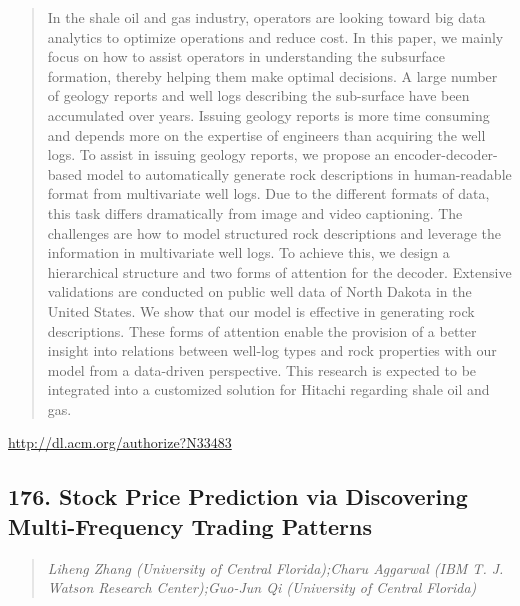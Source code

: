 \documentclass{article}
\begin{document}
\begin{quote}
In the shale oil and gas industry, operators are looking toward big data analytics to optimize operations and reduce cost. In this paper, we mainly focus on how to assist operators in understanding the subsurface formation, thereby helping them make optimal decisions. A large number of geology reports and well logs describing the sub-surface have been accumulated over years. Issuing geology reports is more time consuming and depends more on the expertise of engineers than acquiring the well logs. To assist in issuing geology reports, we propose an encoder-decoder-based model to automatically generate rock descriptions in human-readable format from multivariate well logs. Due to the different formats of data, this task differs dramatically from image and video captioning. The challenges are how to model structured rock descriptions and leverage the information in multivariate well logs. To achieve this, we design a hierarchical structure and two forms of attention for the decoder. Extensive validations are conducted on public well data of North Dakota in the United States. We show that our model is effective in generating rock descriptions. These forms of attention enable the provision of a better insight into relations between well-log types and rock properties with our model from a data-driven perspective. This research is expected to be integrated into a customized solution for Hitachi regarding shale oil and gas.
\end{quote}

\href{http://dl.acm.org/authorize?N33483}{http://dl.acm.org/authorize?N33483}

\subsection{176. Stock Price Prediction via Discovering Multi-Frequency Trading Patterns}

\begin{quote}
\footnotesize{\textit{Liheng Zhang (University of Central Florida);Charu Aggarwal (IBM T. J. Watson Research Center);Guo-Jun Qi (University of Central Florida)}}

\end{quote}
\end{document}
